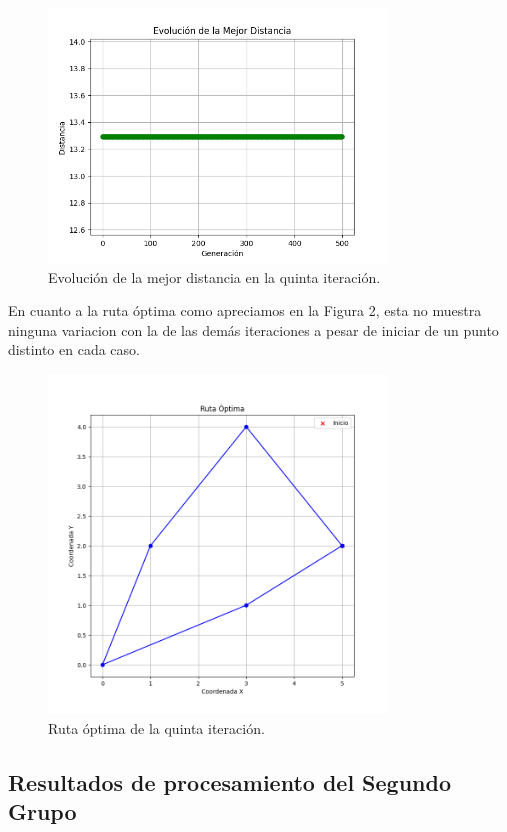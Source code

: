 \documentclass{article}
\begin{document}
    \begin{figure}[h]
    \centering
    \includegraphics[width=9cm]{img/5Generacion.png}
    \caption{Evolución de la mejor distancia en la quinta iteración.}
    \label{fig:etiqueta1}
  \end{figure}

  En cuanto a la ruta óptima como apreciamos en la Figura 2, esta no muestra ninguna variacion con la de las demás iteraciones a pesar de iniciar de un punto distinto en cada caso.

  \begin{figure}[h]
    \centering
    \includegraphics[width=9cm]{img/5Ruta.png}
    \caption{Ruta óptima de la quinta iteración.}
    \label{fig:etiqueta2}
  \end{figure}

\newpage
\subsection{Resultados de procesamiento del Segundo Grupo}
\end{document}
